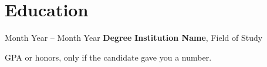 \vspace{-0.3cm}
\section{Education}

\begin{twocolentry}{
    Month Year -- Month Year
}
    \textbf{Degree} \textbf{Institution Name}, Field of Study
    \begin{highlights}
        \item GPA or honors, only if the candidate gave you a number.
    \end{highlights}
\end{twocolentry}
